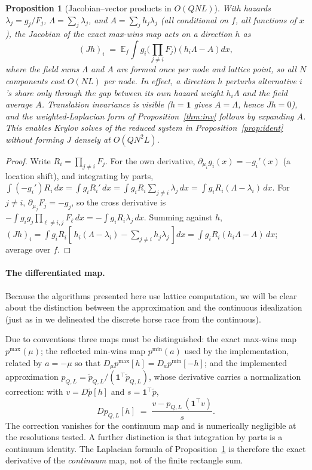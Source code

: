 \documentclass[12pt]{article}
\newtheorem{proposition}{Proposition}
\theoremstyle{remark}
\newcommand{\E}{\mathbb{E}}
\begin{document}
\begin{proposition}[Jacobian--vector products in $O(QNL)$]\label{prop:jvp}
With hazards $\lambda_j = g_j / F_j$, $\Lambda = \sum_j \lambda_j$, and
$A = \sum_j h_j \lambda_j$ (all conditional on $f$, all functions of $x$),
the Jacobian of the exact max-wins map acts on a direction $h$ as
\[
(Jh)_i \;=\; \E_f \int g_i \Big(\prod_{j \ne i} F_j\Big)
\left( h_i \Lambda - A \right) dx ,
\]
where the field sums $\Lambda$ and $A$ are formed once per node and lattice
point, so all $N$ components cost $O(NL)$ per node. In effect, a direction
$h$ perturbs alternative $i$'s share only through the gap between its own
hazard weight $h_i \Lambda$ and the field average $A$. Translation
invariance is visible ($h = \mathbf{1}$ gives $A = \Lambda$, hence $Jh =
0$), and the weighted-Laplacian form of Proposition~\ref{thm:inv} follows by
expanding $A$.
This enables Krylov solves of the reduced system in
Proposition~\ref{prop:ident} without forming $J$ densely at $O(QN^2L)$.
\end{proposition}
\begin{proof}
Write $R_i = \prod_{j \ne i} F_j$. For the own derivative,
$\partial_{\mu_i} g_i(x) = -g_i'(x)$ (a location shift), and integrating by
parts, $\int (-g_i') R_i\,dx = \int g_i R_i' \,dx = \int g_i R_i
\sum_{j \ne i} \lambda_j\,dx = \int g_i R_i (\Lambda -
\lambda_i)\,dx$. For $j \ne i$, $\partial_{\mu_j} F_j = -g_j$, so the
cross derivative is $-\int g_i g_j \prod_{\ell \ne i,j} F_\ell\,dx =
-\int g_i R_i \lambda_j\,dx$. Summing against $h$,
$(Jh)_i = \int g_i R_i [\,h_i(\Lambda - \lambda_i) - \sum_{j \ne i}
h_j \lambda_j\,]dx = \int g_i R_i (h_i \Lambda - A)\,dx$; average over
$f$.
\end{proof}

\paragraph{The differentiated map.} 
Because the algorithms presented here use lattice computation, we will be clear about
the distinction between the approximation and the continuous idealization (just as in \citet{cotton2021}
we delineated the discrete horse race from the continuous). 

Due to conventions three maps must be
distinguished: the exact max-wins map $p^{\max}(\mu)$; the reflected
min-wins map $p^{\min}(a)$ used by the implementation, related by $a = -\mu$
so that $D_\mu p^{\max}[h] = D_a p^{\min}[-h]$; and the implemented
approximation $p_{Q,L} = \tilde p_{Q,L} / (\mathbf{1}^\top \tilde
p_{Q,L})$, whose derivative carries a normalization correction: with $v =
D\tilde p[h]$ and $s = \mathbf{1}^\top \tilde p$,
\[
D p_{Q,L}[h] \;=\; \frac{v - p_{Q,L}\, (\mathbf{1}^\top v)}{s}.
\]
The correction vanishes for the continuum map and is numerically
negligible at the resolutions tested. A further distinction is that integration by parts is a continuum
identity. The Laplacian formula of Proposition~\ref{prop:jvp} is
therefore the exact derivative of the \emph{continuum} map, not of the
finite rectangle sum.
\end{document}
